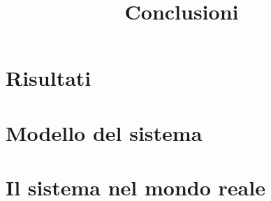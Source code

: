 \title{Conclusioni}
\maketitle
\label{sec:conclusions}



\section{Risultati}

\section{Modello del sistema}

\section{Il sistema nel mondo reale}

